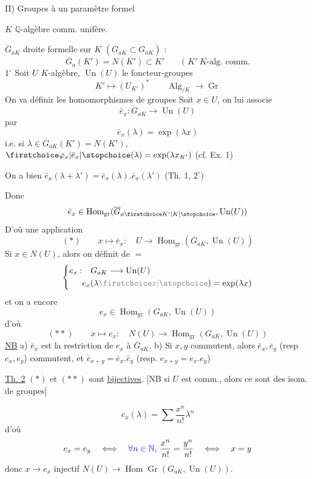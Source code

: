 II) Groupes à un paramètre formel

$K$ $\mathbb{Q}$-algèbre comm. unifère.

$\overline G_{aK}$ droite formelle sur $K$ $(\overline G_{aK}\subset G_{aK})$ :
\[
\overline G_a(K')=N(K')\subset K'\qquad\text{( }K'\ K\text{-alg. comm.}
\]
$1^\circ$ Soit $U$ $K$-algèbre, $\operatorname{Un}(U)$ le foncteur-groupes
\[
K'\longmapsto(U_{K'})^*\qquad\operatorname{Alg}_{/K}\longrightarrow\operatorname{Gr}
\]
On va définir les homomorphismes de groupes
Soit $x\in U$, on lui associe
\[
\bar e_x:\overline G_{aK}\longrightarrow\operatorname{Un}(U)
\]
par
\[
\bar e_x(\lambda)=\exp(\lambda x)
\]
i.e. si $\lambda\in\overline G_{aK}(K')=N(K')$, $\unsure{\varphi_x|\bar e_x}(\lambda)=\exp(\lambda x_{K'})$ (cf. Ex. 1)

On a bien $\bar e_x(\lambda+\lambda')=\bar e_x(\lambda).\bar e_x(\lambda')$ (Th. 1, $2^\circ$)

Donc
\[
\bar e_x\in\operatorname{Hom}_{\mathrm{gr}}(\overline G_{a\unsure{K'|K}},\operatorname{Un}(U))
\]
D'où une application
\[
(*)\qquad x\longmapsto\bar e_x:\quad U\longrightarrow\operatorname{Hom}_{\mathrm{gr}}(\overline G_{aK},\operatorname{Un}(U))
\]
Si $x\in N(U)$, alors on définit de $=$
\[
\left\{\begin{aligned}
e_x:&\quad G_{aK}\longrightarrow\operatorname{Un}(U)\\
&e_x(\lambda\deleted{\unsure{x}})=\exp(\lambda x)
\end{aligned}\right.
\]
et on a encore
\[
e_x\in\operatorname{Hom}_{\mathrm{gr}}(G_{aK},\operatorname{Un}(U))
\]
d'où
\[
(**)\qquad x\longmapsto e_x:\quad N(U)\longrightarrow\operatorname{Hom}_{\mathrm{gr}}(G_{aK},\operatorname{Un}(U))
\]
\uline{NB} a) $\bar e_x$ est la restriction de $e_x$ à $\overline G_{aK}$. b) Si $x,y$ commutent, alors $\bar e_x,\bar e_y$ (resp $e_x,e_y$) commutent, et $\bar e_{x+y}=\bar e_x.\bar e_y$ (resp. $e_{x+y}=e_x.e_y$)

\uline{Th. 2} $(*)$ et $(**)$ sont \uline{bijectives}. [NB si $U$ est comm., alors ce sont des isom. de groupes]

\[
e_x(\lambda)=\sum\frac{x^n}{n!}\lambda^n
\]
d'où
\[
e_x=e_y\quad\Longleftrightarrow\quad\inserted{\forall n\in\mathbb{N},}\ \frac{x^n}{n!}=\frac{y^n}{n!}\quad\Longleftrightarrow\quad x=y
\]
donc $x\longrightarrow e_x$ injectif $N(U)\longrightarrow\operatorname{Hom}\operatorname{Gr}(G_{aK},\operatorname{Un}(U))$.

